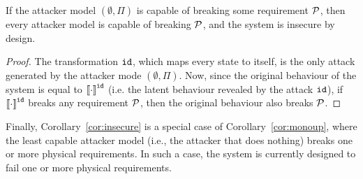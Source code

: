 {{\begin{corollary}
  \label{cor:insecure}
  If the attacker model $(\emptyset,\Pi)$ is capable of breaking some requirement $\mathcal{P}$, then every attacker model is capable of breaking $\mathcal{P}$, and the system is insecure by design.
\end{corollary}
\begin{proof}
  The transformation ${\texttt{id}}$, which maps every state to itself, is the only attack generated by the attacker mode $(\emptyset,\Pi)$. Now, since the original behaviour of the system is equal to ${{{\llbracket\cdot\rrbracket}}}^{{\texttt{id}}}$ (i.e. the latent behaviour revealed by the attack ${\texttt{id}}$), if ${{{\llbracket\cdot\rrbracket}}}^{{\texttt{id}}}$ breaks any requirement $\mathcal{P}$, then the original behaviour also breaks $\mathcal{P}$.
\end{proof}
Finally, Corollary~\ref{cor:insecure} is a special case of Corollary~\ref{cor:monoup}, where the least capable attacker model (i.e., the attacker that does nothing) breaks one or more physical requirements. In such a case, the system is currently designed to fail one or more physical requirements. 
 

}}
